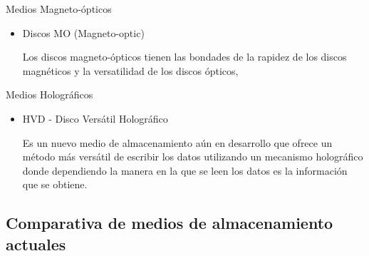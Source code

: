 Medios Magneto-\'{o}pticos
\begin{itemize}
  \item Discos MO (Magneto-optic)
  
  Los discos magneto-\'{o}pticos tienen las bondades de la rapidez de los discos magn\'{e}ticos y la versatilidad de los discos \'{o}pticos, 
  
\end{itemize}
Medios Hologr\'{a}ficos
\begin{itemize}
  \item HVD - Disco Vers\'{a}til Hologr\'{a}fico
  
  Es un nuevo medio de almacenamiento a\'{u}n en desarrollo que ofrece un m\'{e}todo m\'{a}s vers\'{a}til de escribir los datos utilizando un mecanismo hologr\'{a}fico donde dependiendo la manera en la que se leen los datos es la informaci\'{o}n que se obtiene.
  
\end{itemize}
      \subsection {Comparativa de medios de almacenamiento actuales}

